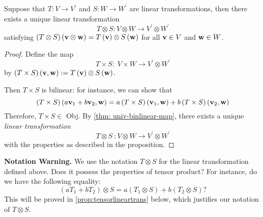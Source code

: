 \begin{proposition} \label{prop:tensor_linear_trans}
Suppose that \(T : V \rightarrow  {V}^{\prime }\) and \(S : W \rightarrow  {W}^{\prime }\) are linear transformations, then there exists a unique linear transformation
\[
T \otimes  S : V \otimes  W \rightarrow  {V}^{\prime } \otimes  {W}^{\prime }
\]
satisfying \(\left( {T \otimes  S}\right) \left( {\bf v} \otimes  {\bf w}\right)  = T\left({\bf v}\right)  \otimes  S\left( {\bf w}\right)
\) for all ${\bf v} \in V$ and ${\bf w} \in W$.
\end{proposition} 

\begin{proof}
Define the map
\[
T \times  S : \;V \times  W \rightarrow  {V}^{\prime } \otimes  {W}^{\prime }
\]
by \(\left( {T \times  S}\right) \left( {\bf v},{\bf w}\right)  := T\left( {\bf v}\right)  \otimes  S\left({\bf w}\right)
\).

Then $T \times S$ is bilinear: for instance, we can show that
\[
\left( {T \times  S}\right) \left( {a{\bf v}_1 + b{\bf v}_2,{\bf w}}\right)  = a\left( {T \times  S}\right) \left( {{\bf v}_1,{\bf w}}\right)  + b\left( {T \times  S}\right) \left( {{\bf v}_2,{\bf w}}\right)
\]
Therefore, \(T \times  S \in\) Obj. By \autoref{thm: univ-binlinear-map}, there exists a unique {\it linear transformation}
\[
T \otimes  S\ :V \otimes  W \rightarrow  {V}^{\prime } \otimes  {W}^{\prime }
\]
with the properties as described in the proposition.
\end{proof} 

\noindent \textbf{Notation Warning.} We use the notation \(T \otimes  S\) for the linear transformation defined above. Does it possess the properties of tensor product? For instance, do we have the following equality:
\[
\left( {a{T}_1 + b{T}_2}\right)  \otimes  S = a\left( {{T}_1 \otimes  S}\right)  + b\left( {{T}_2 \otimes  S}\right) ?
\]
This will be proved in \autoref{prop:tensorlineartrans} below, which justifies our notation of $T \otimes S$.

